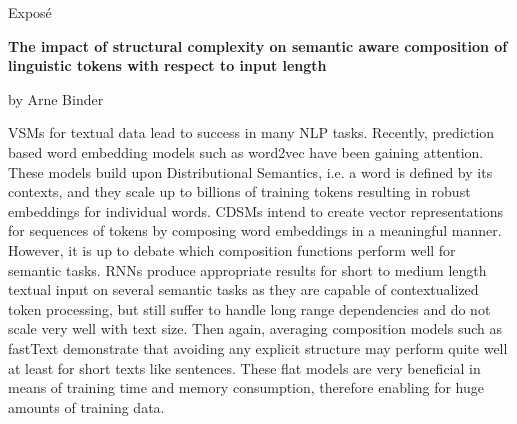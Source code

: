 
\begin{center}
	\huge{Expos\'e} 
	\vspace{0.5cm}
	 
	\large{\bf{The impact of structural complexity on semantic aware composition of linguistic tokens with respect to input length}} 
	\vspace{0.5cm}

	by Arne Binder \\
\end{center}

\vspace{0.5cm}
\normalsize

\acfp{VSM} for textual data lead to success in many \ac{NLP} tasks. Recently, prediction based word embedding models such as word2vec %
have been gaining attention. These models build upon Distributional Semantics, i.e. a word is defined by its contexts, and they scale up to billions of training tokens %
resulting in robust embeddings for individual words. 
\acfp{CDSM} intend to create vector representations for sequences of tokens by composing word embeddings in a meaningful manner. However, it is up to debate which composition functions perform well for semantic tasks. \acp{RNN} produce appropriate results for short to medium length textual input on several semantic tasks  as they are capable of contextualized token processing, but still suffer to handle long range dependencies and do not scale very well with text size. Then again, averaging composition models such as fastText \autocite{joulin_bag_2017} demonstrate that avoiding any explicit structure may perform quite well at least for short texts like sentences. These flat models are very beneficial in means of training time and memory consumption, therefore enabling for huge amounts of training data. 

